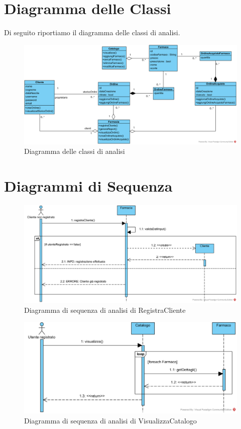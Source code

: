 \section{Diagramma delle Classi}
Di seguito riportiamo il diagramma delle classi di analisi.
\begin{figure}[!ht]
	\centering
	\includegraphics[width=0.8\linewidth]{assets/ClassDiagramAnalisi.png}
	\caption{Diagramma delle classi di analisi}
\end{figure}

\section{Diagrammi di Sequenza}

\begin{figure}[!h]
	\centering
	\includegraphics[width=\linewidth]{assets/sequence_analisi/RegistraCliente.png}
	\caption{Diagramma di sequenza di analisi di RegistraCliente}
\end{figure}

\vfill
\pagebreak

\begin{figure}[!hbp]
	\centering
	\includegraphics[width=0.8\linewidth]{assets/sequence_analisi/VisualizzaCatalogo.png}
	\caption{Diagramma di sequenza di analisi di VisualizzaCatalogo}
\end{figure}

